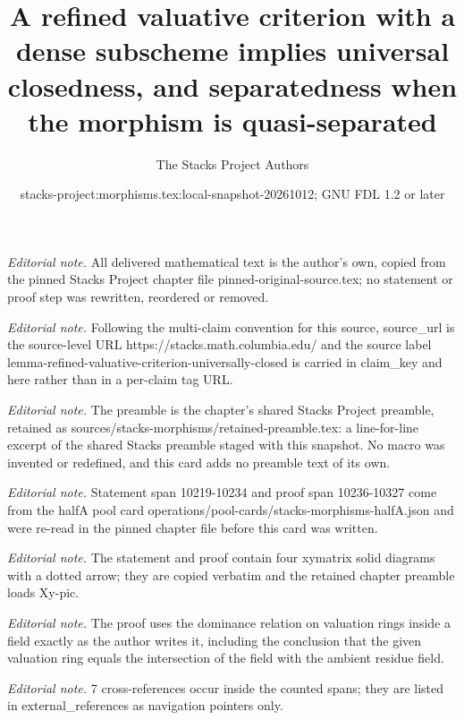 \documentclass[10pt,a4paper]{amsart}
\title{A refined valuative criterion with a dense subscheme implies universal closedness, and separatedness when the morphism is quasi-separated}
\author{The Stacks Project Authors}
\date{stacks-project:morphisms.tex:local-snapshot-20261012; GNU FDL 1.2 or later}
\theoremstyle{plain}
\theoremstyle{definition}
\theoremstyle{remark}
\numberwithin{equation}{subsection}
\begin{document}
\maketitle
\noindent\textit{Editorial note.} All delivered mathematical text is the author's own, copied from the pinned Stacks Project chapter file pinned-original-source.tex; no statement or proof step was rewritten, reordered or removed.\par\medskip
\noindent\textit{Editorial note.} Following the multi-claim convention for this source, source\_url is the source-level URL https://stacks.math.columbia.edu/ and the source label lemma-refined-valuative-criterion-universally-closed is carried in claim\_key and here rather than in a per-claim tag URL.\par\medskip
\noindent\textit{Editorial note.} The preamble is the chapter's shared Stacks Project preamble, retained as sources/stacks-morphisms/retained-preamble.tex: a line-for-line excerpt of the shared Stacks preamble staged with this snapshot. No macro was invented or redefined, and this card adds no preamble text of its own.\par\medskip
\noindent\textit{Editorial note.} Statement span 10219-10234 and proof span 10236-10327 come from the halfA pool card operations/pool-cards/stacks-morphisms-halfA.json and were re-read in the pinned chapter file before this card was written.\par\medskip
\noindent\textit{Editorial note.} The statement and proof contain four xymatrix solid diagrams with a dotted arrow; they are copied verbatim and the retained chapter preamble loads Xy-pic.\par\medskip
\noindent\textit{Editorial note.} The proof uses the dominance relation on valuation rings inside a field exactly as the author writes it, including the conclusion that the given valuation ring equals the intersection of the field with the ambient residue field.\par\medskip
\noindent\textit{Editorial note.} 7 cross-references occur inside the counted spans; they are listed in external\_references as navigation pointers only.\par\medskip
\end{document}
